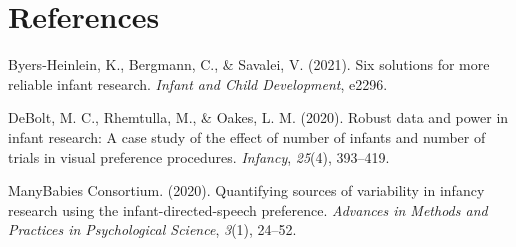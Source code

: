 \documentclass[
  man, donotrepeattitle,floatsintext]{apa6}
\newlength{\cslhangindent}
\newlength{\cslentryspacingunit} %
\newenvironment{CSLReferences}[2] %
 {%
  \setlength{\parindent}{0pt}
  \ifodd #1
  \let\oldpar\par
  \def\par{\hangindent=\cslhangindent\oldpar}
  \fi
  \setlength{\parskip}{#2\cslentryspacingunit}
 }%
 {}
\begin{document}
\hypertarget{section}{%
\subsection{}\label{section}}

\newpage

\hypertarget{references}{%
\section{References}\label{references}}

\begingroup
\setlength{\parindent}{-0.5in}
\setlength{\leftskip}{0.5in}

\hypertarget{refs}{}
\begin{CSLReferences}{1}{0}
\leavevmode{}%
Byers-Heinlein, K., Bergmann, C., \& Savalei, V. (2021). Six solutions for more reliable infant research. \emph{Infant and Child Development}, e2296.

\leavevmode{}%
DeBolt, M. C., Rhemtulla, M., \& Oakes, L. M. (2020). Robust data and power in infant research: A case study of the effect of number of infants and number of trials in visual preference procedures. \emph{Infancy}, \emph{25}(4), 393--419.

\leavevmode{}%
ManyBabies Consortium. (2020). Quantifying sources of variability in infancy research using the infant-directed-speech preference. \emph{Advances in Methods and Practices in Psychological Science}, \emph{3}(1), 24--52.

\end{CSLReferences}

\endgroup
\end{document}
